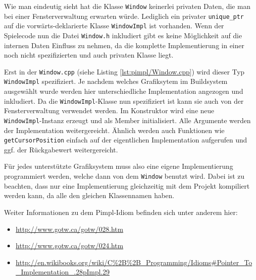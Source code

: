 \documentclass[12pt, a4paper, titlepage, hidelinks]{scrreprt}
\begin{document}
Wie man eindeutig sieht hat die Klasse \texttt{Window} keinerlei privaten Daten, die man bei einer Fensterverwaltung erwarten würde. Lediglich ein privater \texttt{unique\_ptr} auf die vorwärts-deklarierte Klasse \texttt{WindowImpl} ist vorhanden. Wenn der Spielecode nun die Datei \texttt{Window.h} inkludiert gibt es keine Möglichkeit auf die internen Daten Einfluss zu nehmen, da die komplette Implementierung in einer noch nicht spezifizierten und auch privaten Klasse liegt.

Erst in der \texttt{Window.cpp} (siehe Listing \autoref{lst:pimpl/Window.cpp}) wird dieser Typ \texttt{WindowImpl} spezifiziert. Je nachdem welches Grafiksytem im Buildsystem ausgewählt wurde werden hier unterschiedliche Implementation angezogen und inkludiert. Da die \texttt{WindowImpl}-Klasse nun spezifiziert ist kann sie auch von der Fensterverwaltung verwendet werden. Im Konstruktor wird eine neue \texttt{WindowImpl}-Instanz erzeugt und als Member initialisiert. Alle Argumente werden der Implementation weitergereicht. Ähnlich werden auch Funktionen wie \texttt{getCursorPosition} einfach auf der eigentlichen Implementation aufgerufen und ggf. der Rückgabewert weitergereicht.


Für jedes unterstützte Grafiksystem muss also eine eigene Implementierung programmiert werden, welche dann von dem \texttt{Window} benutzt wird. Dabei ist zu beachten, dass nur eine Implementierung gleichzeitig mit dem Projekt kompiliert werden kann, da alle den gleichen Klassennamen haben.


Weiter Informationen zu dem Pimpl-Idiom befinden sich unter anderem hier:
\begin{itemize}
\item \url{http://www.gotw.ca/gotw/028.htm}
\item \url{http://www.gotw.ca/gotw/024.htm}
\item \url{http://en.wikibooks.org/wiki/C%2B%2B_Programming/Idioms#Pointer_To_Implementation_.28pImpl.29}
\end{itemize}
\end{document}
